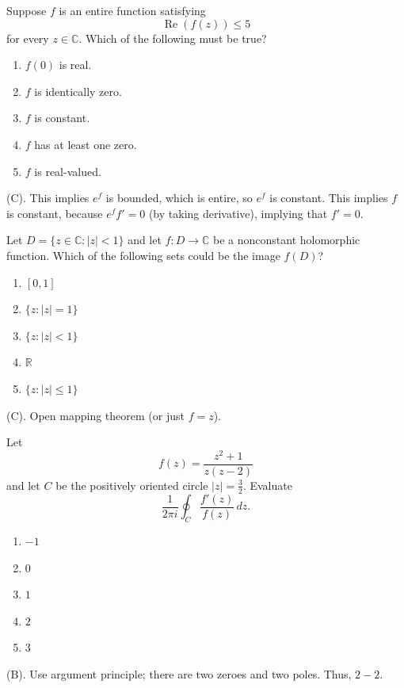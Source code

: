 \begin{exercise}
Suppose $f$ is an entire function satisfying
\[
\operatorname{Re}(f(z))\le5
\]
for every $z\in\mathbb C$. Which of the following must be true?
\begin{enumerate}[label=(\Alph*)]
\item $f(0)$ is real.
\item $f$ is identically zero.
\item $f$ is constant.
\item $f$ has at least one zero.
\item $f$ is real-valued.
\end{enumerate}
\end{exercise}
\begin{solution}
(C). This implies $e^f$ is bounded, which is entire, so $e^f$ is constant.
This implies $f$ is constant, because $e^ff' = 0$ (by taking derivative), 
implying that $f' = 0$.
\end{solution}

\begin{exercise}
Let $D=\{z\in\mathbb C:|z|<1\}$ and let
$f:D\to\mathbb C$ be a nonconstant holomorphic function.
Which of the following sets could be the image $f(D)$?
\begin{enumerate}[label=(\Alph*)]
\item $[0,1]$
\item $\{z:|z|=1\}$
\item $\{z:|z|<1\}$
\item $\mathbb R$
\item $\{z:|z|\le1\}$
\end{enumerate}
\end{exercise}
\begin{solution}
(C). Open mapping theorem (or just $f = z$).
\end{solution}

\begin{exercise}
Let
\[
f(z)=\frac{z^2+1}{z(z-2)}
\]
and let $C$ be the positively oriented circle $|z|=\frac32$. Evaluate
\[
\frac{1}{2\pi i}\oint_C
\frac{f'(z)}{f(z)}\,dz.
\]
\begin{enumerate}[label=(\Alph*)]
\item $-1$
\item $0$
\item $1$
\item $2$
\item $3$
\end{enumerate}
\end{exercise}
\begin{solution}
(B). Use argument principle; there are two zeroes and two poles. Thus, $2-2$.
\end{solution}

